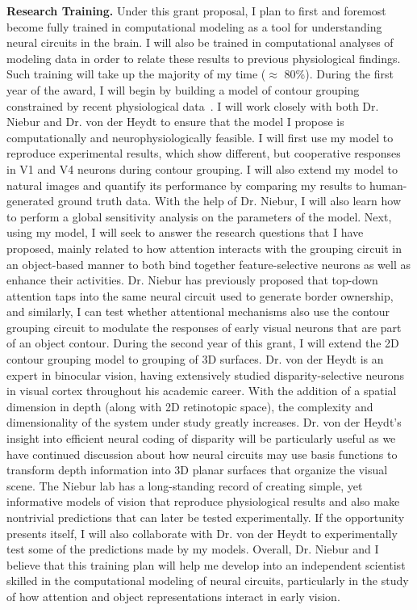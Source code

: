 \documentclass[11pt,notitlepage]{article}
\begin{document}
\textbf{Research Training.} Under this grant proposal, I plan to first
and foremost become fully trained in computational modeling as a tool
for understanding neural circuits in the brain. I will also be trained
in computational analyses of modeling data in order to relate these
results to previous physiological findings. Such training will take up
the majority of my time ($\approx$ 80\%). During the first year of the
award, I will begin by building a model of contour grouping
constrained by recent physiological data~\citep{Chen_etal14}. I will
work closely with both Dr. Niebur and Dr. von der Heydt to ensure that
the model I propose is computationally and neurophysiologically
feasible. I will first use my model to reproduce experimental results,
which show different, but cooperative responses in V1 and V4 neurons
during contour grouping. I will also extend
    my model to natural images and quantify its performance by
    comparing my results to human-generated ground truth
    data. With the help of Dr. Niebur, I will also learn
how to perform a global sensitivity analysis on the parameters of the
model. Next, using my model, I will seek to answer the research
questions that I have proposed, mainly related to how 
attention interacts with the grouping
    circuit in an object-based manner to both bind together
    feature-selective neurons as well as enhance their
    activities.
Dr. Niebur has previously proposed that top-down attention taps into
the same neural circuit used to generate border ownership, and
similarly, I can test whether attentional mechanisms also use the
contour grouping circuit to modulate the responses of early visual
neurons that are part of an object
    contour. During the second year of this grant, I will
extend the 2D contour grouping model to grouping of
3D surfaces. Dr. von der Heydt is an expert in
binocular vision, having extensively studied disparity-selective
neurons in visual cortex throughout his academic career. With the
addition of a spatial dimension in depth (along with 2D retinotopic
space), the complexity and dimensionality of the system under study
greatly increases. Dr. von der Heydt's insight into efficient neural
coding of disparity will be particularly useful as we have continued
discussion about how neural circuits may use basis functions to transform depth
information into 3D planar surfaces that organize the visual
scene. The Niebur lab has a long-standing record of creating simple,
yet informative models of vision that reproduce physiological results
and also make nontrivial predictions that can later be tested
experimentally. If the opportunity presents itself, I will also
collaborate with Dr. von der Heydt to experimentally test some of the
predictions made by my models. Overall, Dr. Niebur and I believe that
this training plan will help me develop into an independent scientist
skilled in the computational modeling of neural circuits, particularly
in the study of how attention and object representations interact in
early vision.
\end{document}
